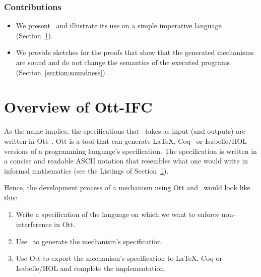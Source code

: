 \documentclass[conference]{IEEEtran}
\begin{document}
\subsubsection*{Contributions}
\begin{itemize}
	\item We present \ottifc\ and illustrate its use on a simple imperative language (Section~\ref{section:ott-ifc}).
	\item We provide sketches for the proofs that show that the generated mechanisms are sound and do not change the semantics of the executed programs (Section~\ref{section:soundness}).
\end{itemize}

\section{Overview of Ott-IFC}\label{section:ott-ifc}
As the name implies, the specifications that \ottifc\ takes as input (and outputs) are written in Ott~\cite{DBLP:journals/jfp/SewellNOPRSS10, Ott}. Ott is a tool that can generate LaTeX, Coq~\cite{Coq} or Isabelle/HOL~\cite{IsabelleHOL} versions of a programming language's specification. The specification is written in a concise and readable ASCII notation that resembles what one would write in informal mathematics (see the Listings of Section~\ref{section:ott-ifc}).

Hence, the development process of a mechanism using Ott and \ottifc\ would look like this:
\begin{enumerate}
  \item Write a specification of the language on which we want to enforce non-interference in Ott.
  \item Use \ottifc\ to generate the mechanism's specification.
  \item Use Ott to export the mechanism's specification to LaTeX, Coq or Isabelle/HOL and complete the implementation.
\end{enumerate}
\end{document}
